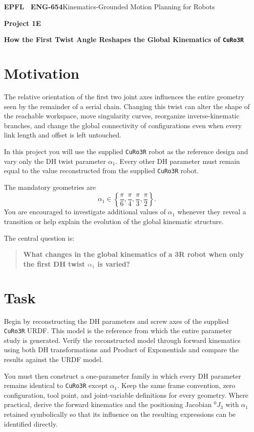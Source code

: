 \documentclass[11pt,a4paper]{article}
\begin{document}
{\small\textbf{EPFL \textbar\ ENG-654}\hfill Kinematics-Grounded Motion Planning for Robots}
\vspace{5mm}

{\color{epflred}\Large\bfseries Project 1E}

{\LARGE\bfseries How the First Twist Angle Reshapes the Global Kinematics of \texttt{CuRo3R}\par}

\section*{Motivation}
The relative orientation of the first two joint axes influences the entire geometry seen by the remainder of a serial chain. Changing this twist can alter the shape of the reachable workspace, move singularity curves, reorganize inverse-kinematic branches, and change the global connectivity of configurations even when every link length and offset is left untouched.

In this project you will use the supplied \texttt{CuRo3R} robot as the reference design and vary only the DH twist parameter $\alpha_1$. Every other DH parameter must remain equal to the value reconstructed from the supplied \texttt{CuRo3R} robot.

The mandatory geometries are
\[
\alpha_1\in\left\{\frac{\pi}{6},\frac{\pi}{4},\frac{\pi}{3},\frac{\pi}{2}\right\}.
\]
You are encouraged to investigate additional values of $\alpha_1$ whenever they reveal a transition or help explain the evolution of the global kinematic structure.

The central question is:
\begin{quote}
\textbf{What changes in the global kinematics of a 3R robot when only the first DH twist $\alpha_1$ is varied?}
\end{quote}

\section*{Task}
Begin by reconstructing the DH parameters and screw axes of the supplied \texttt{CuRo3R} URDF. This model is the reference from which the entire parameter study is generated. Verify the reconstructed model through forward kinematics using both DH transformations and Product of Exponentials and compare the results against the URDF model.

You must then construct a one-parameter family in which every DH parameter remains identical to \texttt{CuRo3R} except $\alpha_1$. Keep the same frame convention, zero configuration, tool point, and joint-variable definitions for every geometry. Where practical, derive the forward kinematics and the positioning Jacobian $^{0}J_3$ with $\alpha_1$ retained symbolically so that its influence on the resulting expressions can be identified directly.
\end{document}
